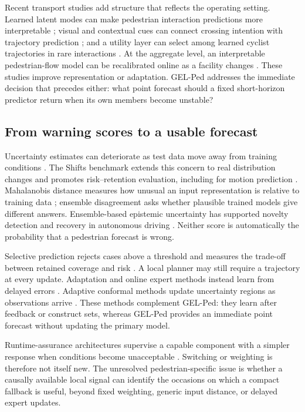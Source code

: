 \documentclass[preprint,11pt,authoryear]{elsarticle}
\begin{document}
Recent transport studies add structure that reflects the operating setting. Learned latent modes can make pedestrian interaction predictions more interpretable \citep{liu2024}; visual and contextual cues can connect crossing intention with trajectory prediction \citep{munir2025}; and a utility layer can select among learned cyclist trajectories in rare interactions \citep{li2023cyclist}. At the aggregate level, an interpretable pedestrian-flow model can be recalibrated online as a facility changes \citep{mai2025}. These studies improve representation or adaptation. GEL-Ped addresses the immediate decision that precedes either: what point forecast should a fixed short-horizon predictor return when its own members become unstable?

\subsection{From warning scores to a usable forecast}
Uncertainty estimates can deteriorate as test data move away from training conditions \citep{ovadia2019uncertainty}. The Shifts benchmark extends this concern to real distribution changes and promotes risk--retention evaluation, including for motion prediction \citep{malinin2021shifts}. Mahalanobis distance measures how unusual an input representation is relative to training data \citep{lee2018mahalanobis}; ensemble disagreement asks whether plausible trained models give different answers. Ensemble-based epistemic uncertainty has supported novelty detection and recovery in autonomous driving \citep{filos2020distribution}. Neither score is automatically the probability that a pedestrian forecast is wrong.

Selective prediction rejects cases above a threshold and measures the trade-off between retained coverage and risk \citep{geifman2017selective,cortes2016rejection}. A local planner may still require a trajectory at every update. Adaptation and online expert methods instead learn from delayed errors \citep{herbster1998tracking,cesabianchi2006prediction,ivanovic2023adaptive,park2024t4p}. Adaptive conformal methods update uncertainty regions as observations arrive \citep{gibbs2021adaptive,dixit2023adaptive}. These methods complement GEL-Ped: they learn after feedback or construct sets, whereas GEL-Ped provides an immediate point forecast without updating the primary model.

Runtime-assurance architectures supervise a capable component with a simpler response when conditions become unacceptable \citep{sha2001simplicity}. Switching or weighting is therefore not itself new. The unresolved pedestrian-specific issue is whether a causally available local signal can identify the occasions on which a compact fallback is useful, beyond fixed weighting, generic input distance, or delayed expert updates.
\end{document}
